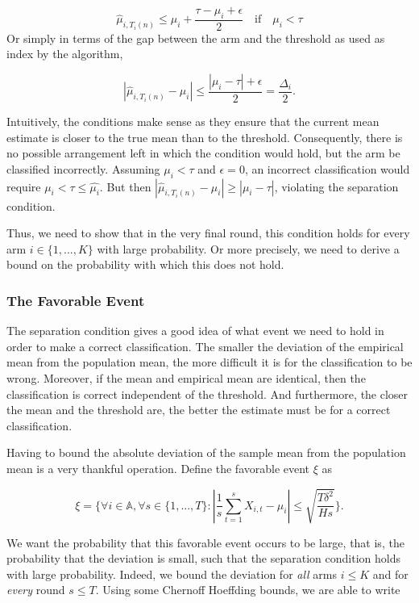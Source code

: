 \documentclass[12pt,]{article}
\begin{document}
\[
\hat{\mu}_{i,T_i(n)} \leq \mu_i + \frac{\tau - \mu_i + \epsilon}{2} \quad \text{if} \quad \mu_i < \tau
\] Or simply in terms of the gap between the arm and the threshold as
used as index by the algorithm,

\[
| \hat{\mu}_{i, T_i(n)} - \mu_i | \leq \frac{|\mu_i - \tau| + \epsilon}{2} = \frac{\Delta_i}{2}.
\]

Intuitively, the conditions make sense as they ensure that the current
mean estimate is closer to the true mean than to the threshold.
Consequently, there is no possible arrangement left in which the
condition would hold, but the arm be classified incorrectly. Assuming
\(\mu_i < \tau\) and \(\epsilon = 0\), an incorrect classification would
require \(\mu_i < \tau \leq \hat{\mu_i}\). But then
\(| \hat{\mu}_{i, T_i(n)} - \mu_i | \geq |\mu_i - \tau|\), violating the
separation condition.

Thus, we need to show that in the very final round, this condition holds
for every arm \(i \in \{1,...,K\}\) with large probability. Or more
precisely, we need to derive a bound on the probability with which this
does not hold.

\subsubsection{The Favorable Event}\label{the-favorable-event}

The separation condition gives a good idea of what event we need to hold
in order to make a correct classification. The smaller the deviation of
the empirical mean from the population mean, the more difficult it is
for the classification to be wrong. Moreover, if the mean and empirical
mean are identical, then the classification is correct independent of
the threshold. And furthermore, the closer the mean and the threshold
are, the better the estimate must be for a correct classification.

Having to bound the absolute deviation of the sample mean from the
population mean is a very thankful operation. Define the favorable event
\(\xi\) as

\[
\xi = \Big\{\forall i \in \mathbb{A}, \forall s \in \{1,...,T\} : |\frac{1}{s} \sum_{t=1}^{s}X_{i,t} - \mu_i| \leq \sqrt{\frac{T \delta^2}{H s}} \Big\}.
\]

We want the probability that this favorable event occurs to be large,
that is, the probability that the deviation is small, such that the
separation condition holds with large probability. Indeed, we bound the
deviation for \emph{all} arms \(i \leq K\) and for \emph{every} round
\(s \leq T\). Using some Chernoff Hoeffding bounds, we are able to write
\end{document}
